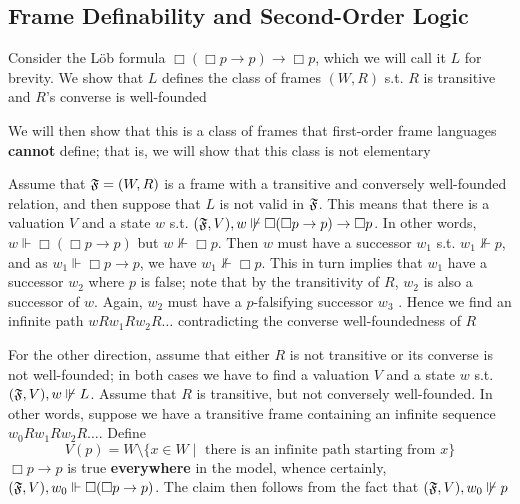 \documentclass[11pt]{article}
\begin{document}
\subsection{Frame Definability and Second-Order Logic}
\label{sec:orgab1643a}
\begin{examplle}[]
Consider the Löb formula \(\Box(\Box p\to p)\to \Box p\), which we will call
it \(L\) for brevity. We show that \(L\) defines the class of frames
\((W,R)\) s.t. \(R\) is transitive and \(R\)'s converse is well-founded

We will then show that this is a class of frames that first-order frame
languages \textbf{cannot} define; that is, we will show that this class is not
elementary

Assume that \(\mathfrak{F}=(W,R)\) is a frame with a transitive and conversely
well-founded relation, and then suppose that \(L\) is not valid in \(\mathfrak{F}\).
This means that there is a valuation \(V\) and a state \(w\) s.t.
\((\mathfrak{F},V),w\not\Vdash\Box(\Box p\to p)\to\Box p\). In other words,
\(w\Vdash\Box(\Box p\to p)\) but \(w\not\Vdash\Box p\). Then \(w\) must have
a successor \(w_1\) s.t. \(w_1\not\Vdash p\), and as \(w_1\Vdash\Box p\to
   p\), we have \(w_1\not\Vdash\Box p\). This in turn implies that \(w_1\) have
a successor \(w_2\) where \(p\) is false; note that by the transitivity of
\(R\), \(w_2\) is also a successor of \(w\). Again, \(w_2\) must have a
\(p\)-falsifying successor \(w_3\) . Hence we find an infinite path
\(wRw_1Rw_2R\dots\) contradicting the converse well-foundedness of \(R\)

For the other direction, assume that either \(R\) is not transitive or its
converse is not well-founded; in both cases we have to find a valuation \(V\)
and a state \(w\) s.t. \((\mathfrak{F},V),w\not\Vdash L\). Assume that \(R\) is
transitive, but not conversely well-founded. In other words, suppose we have
a transitive frame containing an infinite sequence \(w_0Rw_1Rw_2R\dots\).
Define
\begin{equation*}
V(p)=W\setminus\{x\in W\mid \text{ there is an infinite path starting from }x\}
\end{equation*}
\(\Box p\to p\) is true \textbf{everywhere} in the model, whence certainly,
\((\mathfrak{F},V),w_0\Vdash\Box(\Box p\to p)\). The claim then follows from the fact
that \((\mathfrak{F},V),w_0\not\Vdash p\)


\end{examplle}
\end{document}
